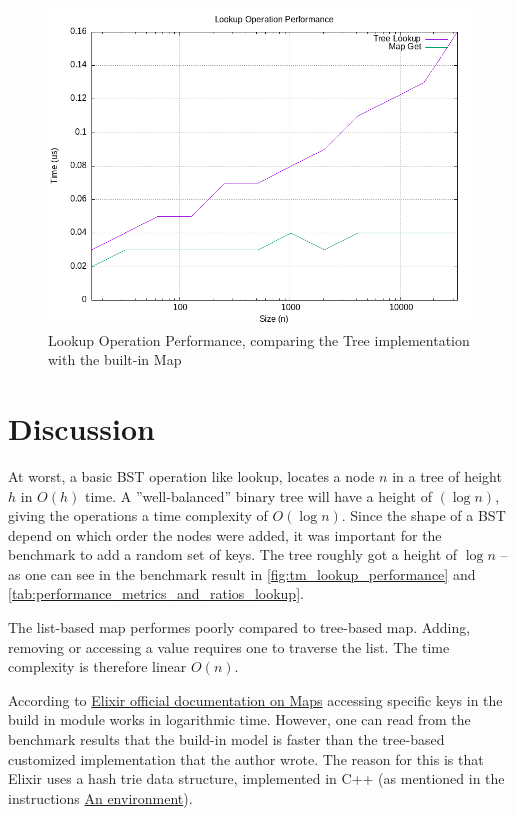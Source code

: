 \documentclass[a4paper,11pt]{article}
\begin{document}
    \begin{figure}[h]
        \centering
        \includegraphics[width=\textwidth]{../data/tm_lookup_performance.png}
        \caption{Lookup Operation Performance, comparing the Tree implementation with the built-in Map}
        \label{fig:tm_lookup_performance}
    \end{figure}

\section*{Discussion}
\label{sec:discussion}
At worst, a basic BST operation like lookup,
locates a node $n$ in a tree
of height $h$ in $O(h)$ time.
A ''well-balanced'' binary tree will have a height of $(\log n)$,
giving the operations a time complexity of $O(\log n)$.
Since the shape of a BST depend on which order the nodes were
added, it was important for the benchmark to add a random set of keys.
The tree roughly got a height of $\log n$ -- as one can see in the benchmark
result in \autoref{fig:tm_lookup_performance} and \autoref{tab:performance_metrics_and_ratios_lookup}.

The list-based map performes poorly compared to tree-based map.
Adding, removing or accessing a value requires one to traverse the list.
The time complexity is therefore linear $O(n)$.

According to
\href{https://hexdocs.pm/elixir/1.12/Map.html}{Elixir official documentation on Maps}
accessing specific keys in the
build in module works in logarithmic time.
    However, one can read from the benchmark results that the build-in model
    is faster than the tree-based customized implementation that the author wrote.
    The reason for this is that Elixir uses a hash trie data structure,
    implemented in C++ (as mentioned in the instructions
\href{https://people.kth.se/~johanmon/courses/id1019/seminars/environment/environment.pdf}{An environment}).
\end{document}
